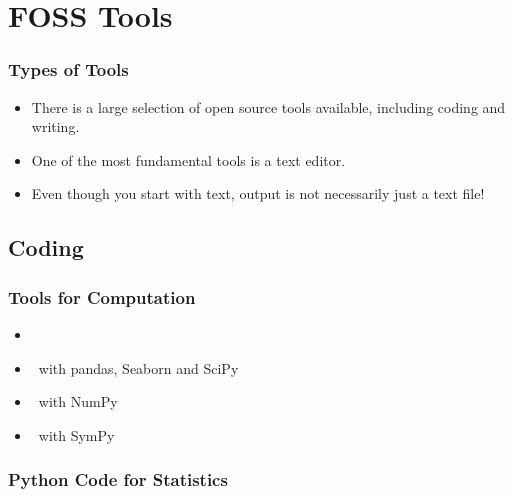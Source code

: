 \documentclass{beamer}
\begin{document}
\section[Tools]{FOSS Tools}

\begin{frame}[<+->]
	\frametitle{Types of Tools}
	\begin{itemize}
		\item There is a large selection of open source tools available, including \alert{coding} and \alert{writing}.

		      \vfill

		\item One of the most fundamental tools is a text editor.

		      \vfill

		\item Even though you start with text, output is not
		      necessarily just a text file!

		      \vfill
	\end{itemize}
\end{frame}

\subsection{Coding}

\begin{frame}[<+->]
	\frametitle{Tools for Computation}
	\begin{itemize}
		\item \rlang

		      \vfill

		\item \pythonlang\ with pandas, Seaborn and SciPy

		      \vfill

		\item \pythonlang\ with NumPy

		      \vfill

		\item \pythonlang\ with SymPy

		      \vfill
	\end{itemize}
\end{frame}

\begin{frame}
	\frametitle{Python Code for Statistics}

\end{frame}
\end{document}

